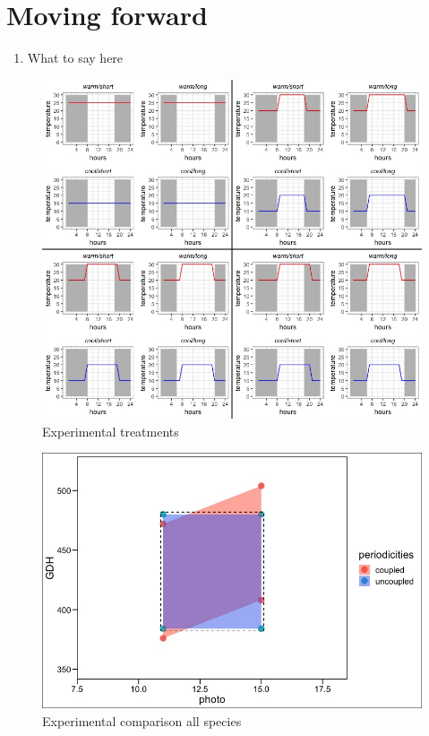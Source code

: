 \documentclass{article}[11pt]
\begin{document}
\section*{Moving forward}
\begin{enumerate}
\item What to say here
\end{enumerate}

 

\begin{figure}[h!]
    \centering
 \includegraphics[width=\textwidth]{..//Plots/periodicity_figures/new_treats.jpeg}
    \caption{Experimental treatments}
    \label{fig:Figure 1}
\end{figure}

\begin{figure}[h!]
    \centering
 \includegraphics[width=\textwidth]{..//Plots/periodicity_figures/Uncoupled_coupled.jpeg}
    \caption{Experimental comparison all species}
    \label{fig:Figure 2}
\end{figure}
\end{document}
